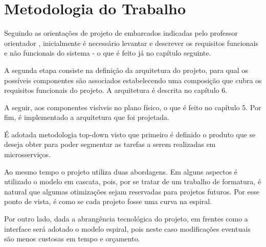 \chapter{Metodologia do Trabalho}
Seguindo as orientações de projeto de embarcados indicadas pelo professor orientador \cite{apostilaSE}, inicialmente é necessário levantar e descrever os requisitos funcionais e não funcionais do sistema - o que é feito já no capítulo seguinte.

A segunda etapa consiste na definição da arquitetura do projeto, para qual os possíveis componentes são associados estabelecendo uma composição que cubra os requisitos funcionais do projeto. A arquitetura é descrita no capítulo 6.

A seguir, aos componentes visíveis no plano físico, o que é feito no capítulo 5. Por fim, é implementado a arquitetura que foi projetada.

É adotada metodologia top-down visto que primeiro é definido o produto que se deseja obter para poder segmentar as tarefas a serem realizadas em microsserviços.

Ao mesmo tempo o projeto utiliza duas abordagens. Em alguns aspectos é utilizado o modelo em cascata, pois, por se tratar de um trabalho de formatura, é natural que algumas otimizações sejam reservadas para projetos futuros. Por esse ponto de vista, é como se cada projeto fosse uma curva na espiral.

Por outro lado, dada a abrangência tecnológica do projeto, em frentes como a interface será adotado o modelo espiral, pois neste caso modificações eventuais são menos custosas em tempo e orçamento.
